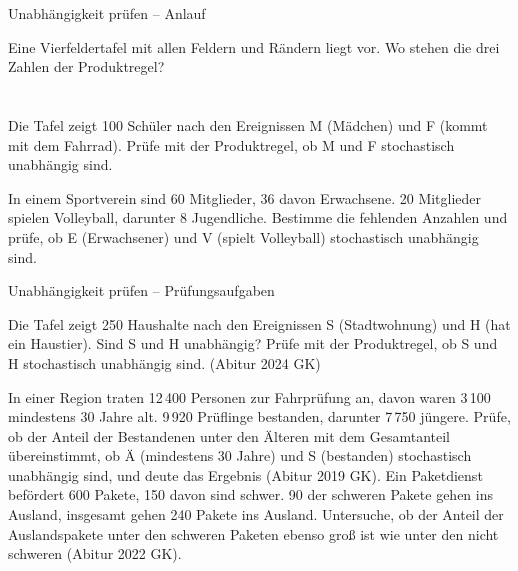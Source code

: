\setcounter{aufgabe}{20}

\begin{aufgabe}{Unabhängigkeit prüfen – Anlauf}
\begin{teile}
\teil Eine Vierfeldertafel mit allen Feldern und Rändern liegt vor. Wo stehen die drei Zahlen der Produktregel? \\  \\  \\ 
\teil Die Tafel zeigt 100 Schüler nach den Ereignissen M (Mädchen) und F (kommt mit dem Fahrrad). Prüfe mit der Produktregel, ob M und F stochastisch unabhängig sind.

\teil In einem Sportverein sind 60 Mitglieder, 36 davon Erwachsene. 20 Mitglieder spielen Volleyball, darunter 8 Jugendliche. Bestimme die fehlenden Anzahlen und prüfe, ob E (Erwachsener) und V (spielt Volleyball) stochastisch unabhängig sind.
\end{teile}
\end{aufgabe}

\begin{aufgabe}{Unabhängigkeit prüfen – Prüfungsaufgaben}
\begin{teile}
\teil Die Tafel zeigt 250 Haushalte nach den Ereignissen S (Stadtwohnung) und H (hat ein Haustier). Sind S und H unabhängig? Prüfe mit der Produktregel, ob S und H stochastisch unabhängig sind. \hfill (Abitur 2024 GK)

\teil In einer Region traten 12\,400 Personen zur Fahrprüfung an, davon waren 3\,100 mindestens 30 Jahre alt. 9\,920 Prüflinge bestanden, darunter 7\,750 jüngere. Prüfe, ob der Anteil der Bestandenen unter den Älteren mit dem Gesamtanteil übereinstimmt, ob Ä (mindestens 30 Jahre) und S (bestanden) stochastisch unabhängig sind, und deute das Ergebnis \hfill (Abitur 2019 GK).
\teil Ein Paketdienst befördert 600 Pakete, 150 davon sind schwer. 90 der schweren Pakete gehen ins Ausland, insgesamt gehen 240 Pakete ins Ausland. Untersuche, ob der Anteil der Auslandspakete unter den schweren Paketen ebenso groß ist wie unter den nicht schweren \hfill (Abitur 2022 GK).
\end{teile}
\end{aufgabe}

